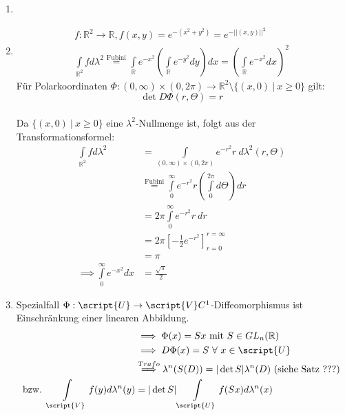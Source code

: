   \begin{example}
    \begin{enumerate}
      \item[]
      \item
        \begin{align*}
          f:\mathbb{R}^2 \to \mathbb{R}, f(x,y) = e^{-(x^2+y^2)} = e^{-||(x,y)||^2}\\
          \int\limits_{\mathbb{R}^2} f d\lambda^2 \stackrel{\text{Fubini}}{=} \int\limits_{\mathbb{R}} e^{-x^2}(\int\limits_{\mathbb{R}} e^{-y^2} dy) dx = (\int\limits_{\mathbb{R}} e^{-x^2} dx)^2
        \end{align*}
        Für Polarkoordinaten $\Phi:(0,\infty) \times (0,2\pi) \to \mathbb{R}^2 \setminus \{(x,0) \ | \ x \geq 0\}$ gilt: \\
        $$\det D\Phi(r,\Theta) = r$$\\
        Da $\{(x,0) \ | \ x \geq 0\}$ eine $\lambda^2$-Nullmenge ist, folgt aus der Transformationsformel:
        \begin{align*}
          \int\limits_{\mathbb{R}^2} f d\lambda^2
          &= \int\limits_{(0,\infty) \times (0,2\pi)} e^{-r^2} r \ d\lambda^2(r,\Theta)\\
          &\stackrel{\text{Fubini}}{=} \int\limits_0^{\infty} e^{-r^2}r(\int\limits_0^{2\pi}d\Theta)dr\\
          &= 2\pi \int\limits_0^{\infty} e^{-r^2} r \ dr\\
          &= 2\pi [-\frac{1}{2} e^{-r^2}]_{r=0}^{r=\infty}\\
          &= \pi\\
          \implies \int\limits_0^{\infty} e^{-x^2} dx &= \frac{\sqrt{\pi}}{2}
        \end{align*}
      \item Spezialfall $\Phi: \script{U} \to \script{V} C^1$-Diffeomorphismus ist Einschränkung einer linearen Abbildung.
        \begin{align*}
          &\implies \Phi(x) = Sx \text{ mit } S\in GL_n(\mathbb{R})\\
          &\implies D\Phi(x) = S \ \forall \ x \in \script{U}\\
          &\stackrel{Trafo}{\implies} \lambda^n(S(D)) = |\det S| \lambda^n(D) \text{ (siehe Satz ???)}\\
          \text{bzw. } \int\limits_{\script{V}} f(y) d\lambda^n(y) &= |\det S| \int\limits_{\script{U}} f(Sx) d\lambda^n(x)
        \end{align*}

\end{enumerate}
\end{example}
